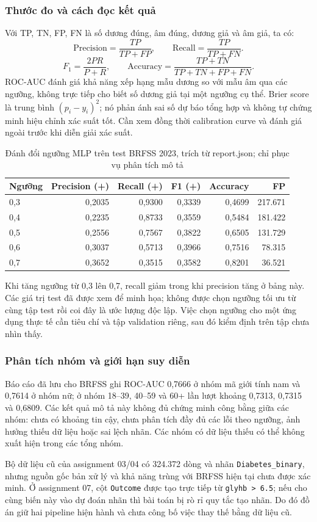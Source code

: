 \subsubsection{Thước đo và cách đọc kết quả}
Với TP, TN, FP, FN là số dương đúng, âm đúng, dương giả và âm giả, ta có:
\[
\mathrm{Precision}=\frac{TP}{TP+FP},\qquad
\mathrm{Recall}=\frac{TP}{TP+FN}.
\]
\[
F_1=\frac{2PR}{P+R},\qquad
\mathrm{Accuracy}=\frac{TP+TN}{TP+TN+FP+FN}.
\]
ROC-AUC đánh giá khả năng xếp hạng mẫu dương so với mẫu âm qua các ngưỡng, không trực tiếp cho biết số dương giả tại một ngưỡng cụ thể. Brier score là trung bình $(p_i-y_i)^2$; nó phản ánh sai số dự báo tổng hợp và không tự chứng minh hiệu chỉnh xác suất tốt. Cần xem đồng thời calibration curve và đánh giá ngoài trước khi diễn giải xác suất.
\begin{table}[H]\centering\small\begin{tabular}{lrrrrr}\toprule
Ngưỡng & Precision (+) & Recall (+) & F1 (+) & Accuracy & FP\\\midrule
0,3 & 0,2035 & 0,9300 & 0,3339 & 0,4699 & 217.671\\
0,4 & 0,2235 & 0,8733 & 0,3559 & 0,5484 & 181.422\\
0,5 & 0,2556 & 0,7567 & 0,3822 & 0,6505 & 131.729\\
0,6 & 0,3037 & 0,5713 & 0,3966 & 0,7516 & 78.315\\
0,7 & 0,3652 & 0,3515 & 0,3582 & 0,8201 & 36.521\\\bottomrule\end{tabular}\caption{Đánh đổi ngưỡng MLP trên test BRFSS 2023, trích từ report.json; chỉ phục vụ phân tích mô tả}\end{table}
Khi tăng ngưỡng từ 0,3 lên 0,7, recall giảm trong khi precision tăng ở bảng này. Các giá trị test đã được xem để minh họa; không được chọn ngưỡng tối ưu từ cùng tập test rồi coi đây là ước lượng độc lập. Việc chọn ngưỡng cho một ứng dụng thực tế cần tiêu chí và tập validation riêng, sau đó kiểm định trên tập chưa nhìn thấy.
\subsubsection{Phân tích nhóm và giới hạn suy diễn}
Báo cáo đã lưu cho BRFSS ghi ROC-AUC 0,7666 ở nhóm mã giới tính nam và 0,7614 ở nhóm nữ; ở nhóm 18--39, 40--59 và 60+ lần lượt khoảng 0,7313, 0,7315 và 0,6809. Các kết quả mô tả này không đủ chứng minh công bằng giữa các nhóm: chưa có khoảng tin cậy, chưa phân tích đầy đủ các lỗi theo ngưỡng, ảnh hưởng thiếu dữ liệu hoặc sai lệch nhãn. Các nhóm có dữ liệu thiếu có thể không xuất hiện trong các tổng nhóm.

Bộ dữ liệu cũ của assignment 03/04 có 324.372 dòng và nhãn \texttt{Diabetes\_binary}, nhưng nguồn gốc bản xử lý và khả năng trùng với BRFSS hiện tại chưa được xác minh. Ở assignment 07, cột \texttt{Outcome} được tạo trực tiếp từ \texttt{glyhb > 6.5}; nếu cho cùng biến này vào dự đoán nhãn thì bài toán bị rò rỉ quy tắc tạo nhãn. Do đó đồ án giữ hai pipeline hiện hành và chưa công bố việc thay thế bằng dữ liệu cũ.
